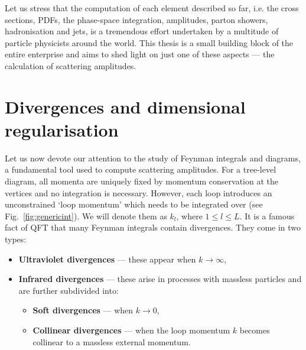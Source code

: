 \documentclass[main.tex]{subfiles}
\begin{document}
Let us stress that the computation of each element described so far, i.e. the cross sections, PDFs, the phase-space integration, amplitudes, parton showers, hadronisation and jets, is a tremendous effort undertaken by a multitude of particle physicists around the world. This thesis is a small building block of the entire enterprise and aims to shed light on just one of these aspects --- the calculation of scattering amplitudes.

\section{Divergences and dimensional regularisation} \label{sec:divergences}
Let us now devote our attention to the study of Feynman integrals and diagrams, a fundamental tool used to compute scattering amplitudes. For a tree-level diagram, all momenta are uniquely fixed by momentum conservation at the vertices and no integration is necessary. However, each loop introduces an unconstrained `loop momentum' which needs to be integrated over (see Fig.~\ref{fig:genericint}). We will denote them as $k_l$, where $1\le l\le L$. It is a famous fact of QFT that many Feynman integrals contain divergences. They come in two types: 
\begin{itemize}
    \item \textbf{Ultraviolet divergences} --- these appear when $k \rightarrow \infty$,
\item \textbf{Infrared divergences} --- these arise in processes with massless particles and are further subdivided into:
\begin{itemize}
    \item \textbf{Soft divergences} --- when $k \rightarrow 0$,
    \item \textbf{Collinear divergences} --- when the loop momentum $k$ becomes collinear to a massless external momentum.
\end{itemize}
\end{itemize}
\end{document}

